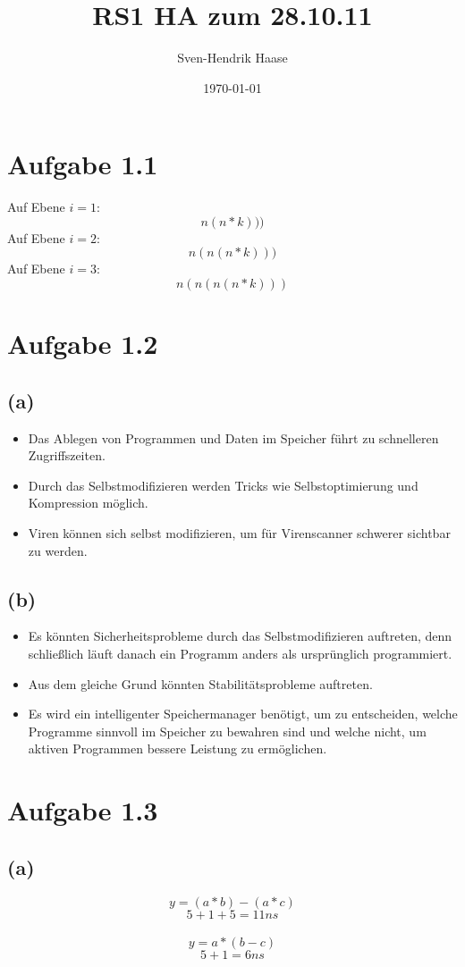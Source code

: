 \documentclass[12pt]{article}
\author{Sven-Hendrik Haase}
\title{RS1 HA zum 28.10.11}
\date{\today}
\begin{document}
\maketitle

\section{Aufgabe 1.1}
Auf Ebene \(i = 1\):
\[n(n*k)))\]
Auf Ebene \(i = 2\):
\[n(n(n*k)))\]
Auf Ebene \(i = 3\):
\[n(n(n(n*k)))\]

\section{Aufgabe 1.2}
\subsection{(a)}
\begin{itemize}
\item Das Ablegen von Programmen und Daten im Speicher führt zu schnelleren
Zugriffszeiten.
\item Durch das Selbstmodifizieren werden Tricks wie Selbstoptimierung und
Kompression möglich.
\item Viren können sich selbst modifizieren, um für Virenscanner schwerer sichtbar zu werden.
\end{itemize}
\subsection{(b)}
\begin{itemize}
\item Es könnten Sicherheitsprobleme durch das Selbstmodifizieren auftreten, denn
schließlich läuft danach ein Programm anders als ursprünglich programmiert.
\item Aus dem gleiche Grund könnten Stabilitätsprobleme auftreten.
\item Es wird ein intelligenter Speichermanager benötigt, um zu entscheiden, welche
Programme sinnvoll im Speicher zu bewahren sind und welche nicht, um aktiven Programmen bessere Leistung zu ermöglichen.
\end{itemize}

\section{Aufgabe 1.3}
\subsection{(a)}
\[y = ( a * b ) - ( a * c )\]
\[5 + 1 + 5 = 11 ns\]
\\
\[y = a * ( b - c)\]
\[5 + 1 =  6 ns\]
\end{document}
